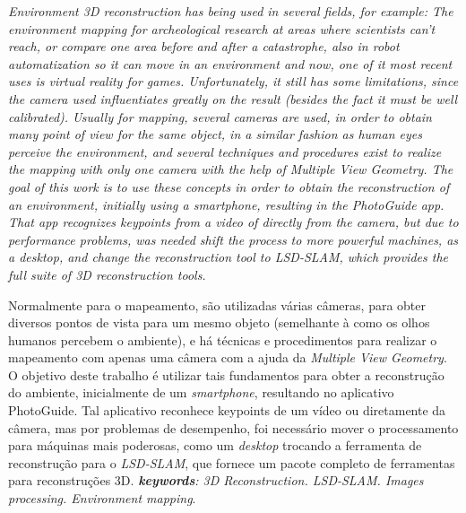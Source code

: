 \setlength{\absparsep}{18pt} %
\begin{resumo}[Abstract]
\textit{Environment 3D reconstruction has being used in several fields, for example: The environment mapping for archeological research at areas where scientists can't reach, or compare one area before and after a catastrophe\cite{SLAMAP}, also in robot automatization so it can move in an environment and now, one of it most recent uses is virtual reality for games. Unfortunately, it still has some limitations, since the camera used influentiates greatly on the result (besides the fact it must be well calibrated). Usually for mapping, several cameras are used, in order to obtain many point of view for the same object, in a similar fashion as human eyes perceive the environment, and several techniques and procedures exist to realize the mapping with only one camera with the help of Multiple View Geometry. The goal of this work is to use these concepts in order to obtain the reconstruction of an environment, initially using a smartphone, resulting in the PhotoGuide app. That app recognizes keypoints from a video of directly from the camera, but due to performance problems, was needed shift the process to more powerful machines, as a desktop, and change the reconstruction tool to LSD-SLAM, which provides the full suite of 3D reconstruction tools.}

Normalmente para o mapeamento, são utilizadas várias câmeras, para obter diversos pontos de vista para um mesmo objeto (semelhante à como os olhos humanos percebem o ambiente), e há técnicas e procedimentos para realizar o mapeamento com apenas uma câmera com a ajuda da \textit{Multiple View Geometry}. O objetivo deste trabalho é utilizar tais fundamentos para obter a reconstrução do ambiente, inicialmente de um \textit{smartphone}, resultando no aplicativo PhotoGuide. Tal aplicativo reconhece keypoints de um vídeo ou diretamente da câmera, mas por problemas de desempenho, foi necessário mover o processamento para máquinas mais poderosas, como um \textit{desktop} trocando a ferramenta de reconstrução para o \textit{LSD-SLAM}, que fornece um pacote completo de ferramentas para reconstruções 3D. 
\textit{\textbf{keywords}: 3D Reconstruction. LSD-SLAM. Images processing. Environment mapping}.
\end{resumo}